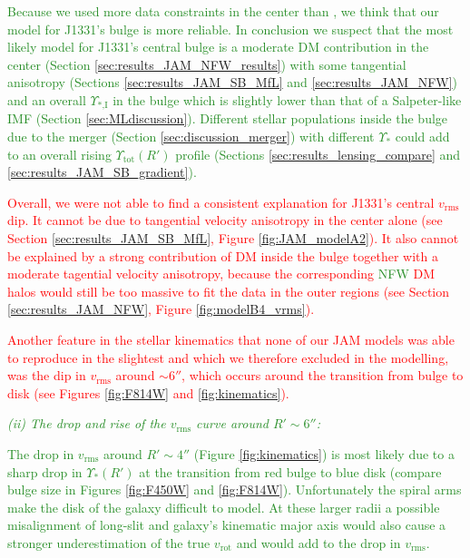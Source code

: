 \documentclass[useAMS,usenatbib]{mnras}
\newcommand{\NEW}[1]{\textcolor{ForestGreen}{#1}}
\newcommand{\OLD}[1]{\textcolor{Red}{#1}}
\begin{document}
\NEW{Because we used more data constraints in the center than \citet{SWELLSV}, we think that our model for J1331's bulge is more reliable. In conclusion we suspect that the most likely model for J1331's central bulge is a moderate DM contribution in the center (Section \ref{sec:results_JAM_NFW_results}) with some tangential anisotropy (Sections \ref{sec:results_JAM_SB_MfL} and \ref{sec:results_JAM_NFW}) and an overall $\Upsilon_\text{*,I}$ in the bulge which is slightly lower than that of a Salpeter-like IMF (Section \ref{sec:MLdiscussion}). Different stellar populations inside the bulge due to the merger (Section \ref{sec:discussion_merger}) with different $\Upsilon_{*}$ could add to an overall rising $\Upsilon_\text{tot}(R')$ profile (Sections \ref{sec:results_lensing_compare} and \ref{sec:results_JAM_SB_gradient}).}

\OLD{Overall, we were not able to find a consistent explanation for J1331's central $v_\text{rms}$ dip. It cannot be due to tangential velocity anisotropy in the center alone (see Section \ref{sec:results_JAM_SB_MfL}, Figure \ref{fig:JAM_modelA2}). It also cannot be explained by a strong contribution of DM inside the bulge together with a moderate tagential velocity anisotropy, because the corresponding \NEW{NFW} DM halo\OLD{s} would still be too massive to fit the data in the outer regions (see Section \ref{sec:results_JAM_NFW}, Figure \ref{fig:modelB4_vrms}).}

\OLD{Another feature in the stellar kinematics that none of our JAM models was able to reproduce in the slightest and which we therefore excluded in the modelling, was the dip in $v_\text{rms}$ around $\sim 6''$, which occurs around the transition from bulge to disk (see Figures \ref{fig:F814W} and \ref{fig:kinematics}).}


\NEW{\emph{(ii) The drop and rise of the $v_\text{rms}$ curve around $R'\sim 6''$:}}

\NEW{The drop in $v_\text{rms}$ around $R'\sim4''$ (Figure \ref{fig:kinematics}) is most likely due to a sharp drop in $\Upsilon_{*}(R')$ at the transition from red bulge to blue disk (compare bulge size in Figures \ref{fig:F450W} and \ref{fig:F814W}). Unfortunately the spiral arms make the disk of the galaxy difficult to model. At these larger radii a possible misalignment of long-slit and galaxy's kinematic major axis would also cause a stronger underestimation of the true $v_\text{rot}$ and would add to the drop in $v_\text{rms}$.}
\end{document}
